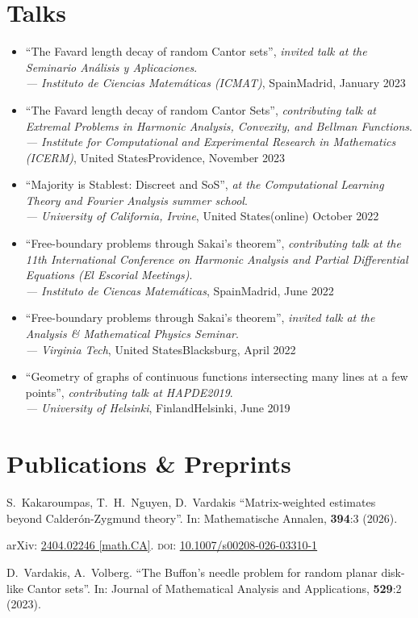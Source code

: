 \documentclass[12pt]{article}
\newcommand{\talk}[5]{\enquote{#1}, \emph{at the #2}.\\ \emph{--- #3}, #4\hfill {#5}}
\newcommand{\contalk}[5]{\enquote{#1}, \emph{contributing talk at #2}.\\ \emph{--- #3}, #4\hfill {#5}}
\newcommand{\invtalk}[5]{\enquote{#1}, \emph{invited talk at the #2}.\\ \emph{--- #3}, #4\hfill {#5}}
\begin{document}
\section*{Talks}

\begin{itemize}
	\item \invtalk{The Favard length decay of random Cantor sets}{Seminario An{\'a}lisis y Aplicaciones}{Instituto de Ciencias Matem{\'a}ticas (ICMAT)}{Spain}{Madrid, January 2023}
	\item \contalk{The Favard length decay of random Cantor Sets}{Extremal Problems in Harmonic Analysis, Convexity, and Bellman Functions}{Institute for Computational and Experimental Research in Mathematics (ICERM)}{United States}{Providence, November 2023}
	\item \talk{Majority is Stablest: Discreet and SoS}{Computational Learning Theory and Fourier Analysis summer school}{University of California, Irvine}{United States}{(online) October 2022}
	\item \contalk{Free-boundary problems through Sakai's theorem}{the 11th International Conference on Harmonic Analysis and Partial Differential Equations (El Escorial Meetings)}{Instituto de Ciencas Matem{\'a}ticas}{Spain}{Madrid, June 2022}
	\item \invtalk{Free-boundary problems through Sakai's theorem}{Analysis \& Mathematical Physics Seminar}{Virginia Tech}{United States}{Blacksburg, April 2022}
	\item \contalk{Geometry of graphs of continuous functions intersecting many lines at a few points}{HAPDE2019}{University of Helsinki}{Finland}{Helsinki, June 2019}
\end{itemize}


\section*{Publications \& Preprints}

S.~Kakaroumpas, T.~H.~Nguyen, D.~Vardakis
	\enquote{Matrix-weighted estimates beyond Calder{\'o}n-Zygmund theory}.
	In: Mathematische Annalen, \textbf{394}:3 (2026).
	
	arXiv: \href{https://arxiv.org/abs/2404.02246}{2404.02246 [math.CA]}.
	\textsc{doi}: \href{https://doi.org/10.1007/s00208-026-03310-1}{10.1007/s00208-026-03310-1}
\medskip


D.~Vardakis, A.~Volberg.
	\enquote{The Buffon's needle problem for random planar disk-like Cantor sets}.
	In: Journal of Mathematical Analysis and Applications, \textbf{529}:2 (2023).
	
\end{document}
